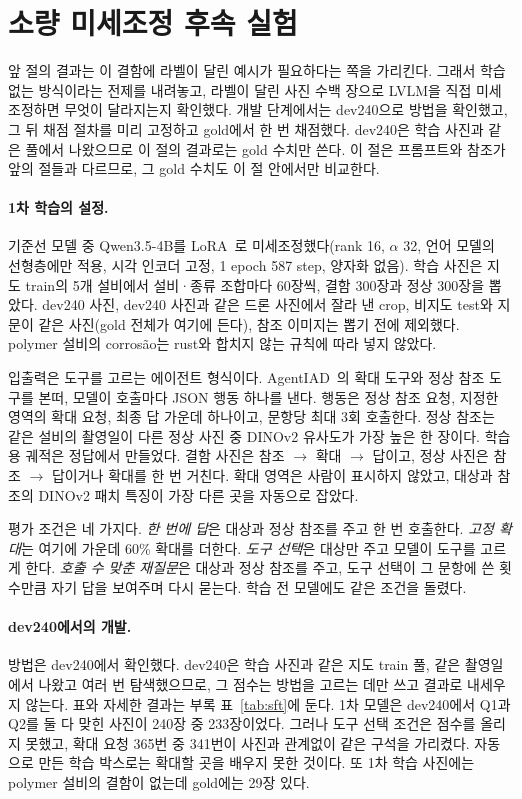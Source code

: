 \documentclass[11pt]{article}
\begin{document}
\section{소량 미세조정 후속 실험}\label{sec:sft}
앞 절의 결과는 이 결함에 라벨이 달린 예시가 필요하다는 쪽을 가리킨다. 그래서 학습 없는 방식이라는 전제를 내려놓고, 라벨이 달린 사진 수백 장으로 LVLM을 직접 미세조정하면 무엇이 달라지는지 확인했다. 개발 단계에서는 dev240으로 방법을 확인했고, 그 뒤 채점 절차를 미리 고정하고 gold에서 한 번 채점했다. dev240은 학습 사진과 같은 풀에서 나왔으므로 이 절의 결과로는 gold 수치만 쓴다. 이 절은 프롬프트와 참조가 앞의 절들과 다르므로, 그 gold 수치도 이 절 안에서만 비교한다.

\paragraph{1차 학습의 설정.} 기준선 모델 중 Qwen3.5-4B를 LoRA~\cite{hu2021lora}로 미세조정했다(rank 16, $\alpha$ 32, 언어 모델의 선형층에만 적용, 시각 인코더 고정, 1 epoch 587 step, 양자화 없음). 학습 사진은 지도 train의 5개 설비에서 설비·종류 조합마다 60장씩, 결함 300장과 정상 300장을 뽑았다. dev240 사진, dev240 사진과 같은 드론 사진에서 잘라 낸 crop, 비지도 test와 지문이 같은 사진(gold 전체가 여기에 든다), 참조 이미지는 뽑기 전에 제외했다. polymer 설비의 corrosão는 rust와 합치지 않는 규칙에 따라 넣지 않았다.

입출력은 도구를 고르는 에이전트 형식이다. AgentIAD~\cite{miao2025agentiad}의 확대 도구와 정상 참조 도구를 본떠, 모델이 호출마다 JSON 행동 하나를 낸다. 행동은 정상 참조 요청, 지정한 영역의 확대 요청, 최종 답 가운데 하나이고, 문항당 최대 3회 호출한다. 정상 참조는 같은 설비의 촬영일이 다른 정상 사진 중 DINOv2 유사도가 가장 높은 한 장이다. 학습용 궤적은 정답에서 만들었다. 결함 사진은 참조 $\rightarrow$ 확대 $\rightarrow$ 답이고, 정상 사진은 참조 $\rightarrow$ 답이거나 확대를 한 번 거친다. 확대 영역은 사람이 표시하지 않았고, 대상과 참조의 DINOv2 패치 특징이 가장 다른 곳을 자동으로 잡았다.

평가 조건은 네 가지다. \emph{한 번에 답}은 대상과 정상 참조를 주고 한 번 호출한다. \emph{고정 확대}는 여기에 가운데 60\% 확대를 더한다. \emph{도구 선택}은 대상만 주고 모델이 도구를 고르게 한다. \emph{호출 수 맞춘 재질문}은 대상과 정상 참조를 주고, 도구 선택이 그 문항에 쓴 횟수만큼 자기 답을 보여주며 다시 묻는다. 학습 전 모델에도 같은 조건을 돌렸다.

\paragraph{dev240에서의 개발.} 방법은 dev240에서 확인했다. dev240은 학습 사진과 같은 지도 train 풀, 같은 촬영일에서 나왔고 여러 번 탐색했으므로, 그 점수는 방법을 고르는 데만 쓰고 결과로 내세우지 않는다. 표와 자세한 결과는 부록 표~\ref{tab:sft}에 둔다. 1차 모델은 dev240에서 Q1과 Q2를 둘 다 맞힌 사진이 240장 중 233장이었다. 그러나 도구 선택 조건은 점수를 올리지 못했고, 확대 요청 365번 중 341번이 사진과 관계없이 같은 구석을 가리켰다. 자동으로 만든 학습 박스로는 확대할 곳을 배우지 못한 것이다. 또 1차 학습 사진에는 polymer 설비의 결함이 없는데 gold에는 29장 있다.
\end{document}
